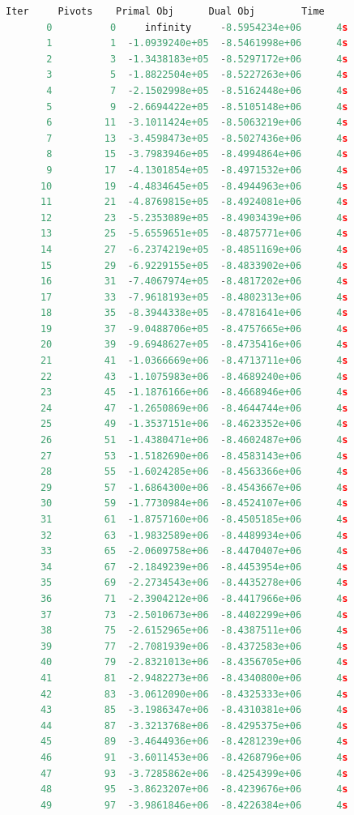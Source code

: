 \documentclass[12pt,nonblindrev]{write_paper}
\begin{document}
\begin{lstlisting}[language=python]
    Iter     Pivots    Primal Obj      Dual Obj        Time
       0          0     infinity     -8.5954234e+06      4s
       1          1  -1.0939240e+05  -8.5461998e+06      4s
       2          3  -1.3438183e+05  -8.5297172e+06      4s
       3          5  -1.8822504e+05  -8.5227263e+06      4s
       4          7  -2.1502998e+05  -8.5162448e+06      4s
       5          9  -2.6694422e+05  -8.5105148e+06      4s
       6         11  -3.1011424e+05  -8.5063219e+06      4s
       7         13  -3.4598473e+05  -8.5027436e+06      4s
       8         15  -3.7983946e+05  -8.4994864e+06      4s
       9         17  -4.1301854e+05  -8.4971532e+06      4s
      10         19  -4.4834645e+05  -8.4944963e+06      4s
      11         21  -4.8769815e+05  -8.4924081e+06      4s
      12         23  -5.2353089e+05  -8.4903439e+06      4s
      13         25  -5.6559651e+05  -8.4875771e+06      4s
      14         27  -6.2374219e+05  -8.4851169e+06      4s
      15         29  -6.9229155e+05  -8.4833902e+06      4s
      16         31  -7.4067974e+05  -8.4817202e+06      4s
      17         33  -7.9618193e+05  -8.4802313e+06      4s
      18         35  -8.3944338e+05  -8.4781641e+06      4s
      19         37  -9.0488706e+05  -8.4757665e+06      4s
      20         39  -9.6948627e+05  -8.4735416e+06      4s
      21         41  -1.0366669e+06  -8.4713711e+06      4s
      22         43  -1.1075983e+06  -8.4689240e+06      4s
      23         45  -1.1876166e+06  -8.4668946e+06      4s
      24         47  -1.2650869e+06  -8.4644744e+06      4s
      25         49  -1.3537151e+06  -8.4623352e+06      4s
      26         51  -1.4380471e+06  -8.4602487e+06      4s
      27         53  -1.5182690e+06  -8.4583143e+06      4s
      28         55  -1.6024285e+06  -8.4563366e+06      4s
      29         57  -1.6864300e+06  -8.4543667e+06      4s
      30         59  -1.7730984e+06  -8.4524107e+06      4s
      31         61  -1.8757160e+06  -8.4505185e+06      4s
      32         63  -1.9832589e+06  -8.4489934e+06      4s
      33         65  -2.0609758e+06  -8.4470407e+06      4s
      34         67  -2.1849239e+06  -8.4453954e+06      4s
      35         69  -2.2734543e+06  -8.4435278e+06      4s
      36         71  -2.3904212e+06  -8.4417966e+06      4s
      37         73  -2.5010673e+06  -8.4402299e+06      4s
      38         75  -2.6152965e+06  -8.4387511e+06      4s
      39         77  -2.7081939e+06  -8.4372583e+06      4s
      40         79  -2.8321013e+06  -8.4356705e+06      4s
      41         81  -2.9482273e+06  -8.4340800e+06      4s
      42         83  -3.0612090e+06  -8.4325333e+06      4s
      43         85  -3.1986347e+06  -8.4310381e+06      4s
      44         87  -3.3213768e+06  -8.4295375e+06      4s
      45         89  -3.4644936e+06  -8.4281239e+06      4s
      46         91  -3.6011453e+06  -8.4268796e+06      4s
      47         93  -3.7285862e+06  -8.4254399e+06      4s
      48         95  -3.8623207e+06  -8.4239676e+06      4s
      49         97  -3.9861846e+06  -8.4226384e+06      4s


\end{lstlisting}
\end{document}
